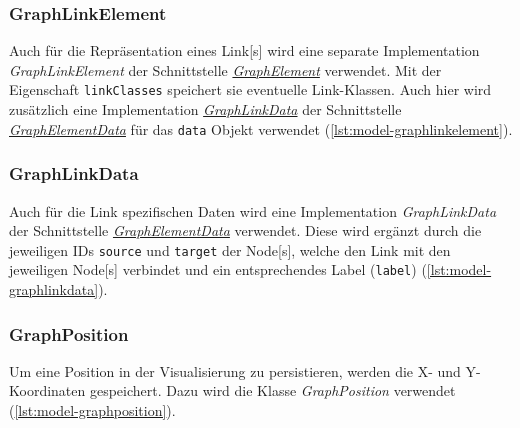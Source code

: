 \subsubsection{GraphLinkElement}
\label{GraphLinkElement}
Auch für die Repräsentation eines \gls{Link}[s] wird eine separate Implementation \textit{GraphLinkElement} der Schnittstelle \hyperref[GraphElement]{\textit{GraphElement}} verwendet. Mit der Eigenschaft \texttt{linkClasses} speichert sie eventuelle Link-Klassen. Auch hier wird zusätzlich eine Implementation \hyperref[GraphLinkData]{\textit{GraphLinkData}} der Schnittstelle \hyperref[GraphElementData]{\textit{GraphElementData}} für das \texttt{data} Objekt verwendet (\autoref{lst:model-graphlinkelement}).


\subsubsection{GraphLinkData}
\label{GraphLinkData}
Auch für die \gls{Link} spezifischen Daten wird eine Implementation \textit{GraphLinkData} der Schnittstelle \hyperref[GraphElementData]{\textit{GraphElementData}} verwendet. Diese wird ergänzt durch die jeweiligen IDs \texttt{source} und \texttt{target} der \gls{Node}[s], welche den \gls{Link} mit den jeweiligen \gls{Node}[s] verbindet und ein entsprechendes Label (\texttt{label}) (\autoref{lst:model-graphlinkdata}).


\subsubsection{GraphPosition}
Um eine Position in der Visualisierung zu persistieren, werden die X- und Y-Koordinaten gespeichert. Dazu wird die Klasse \textit{GraphPosition} verwendet (\autoref{lst:model-graphposition}). 


